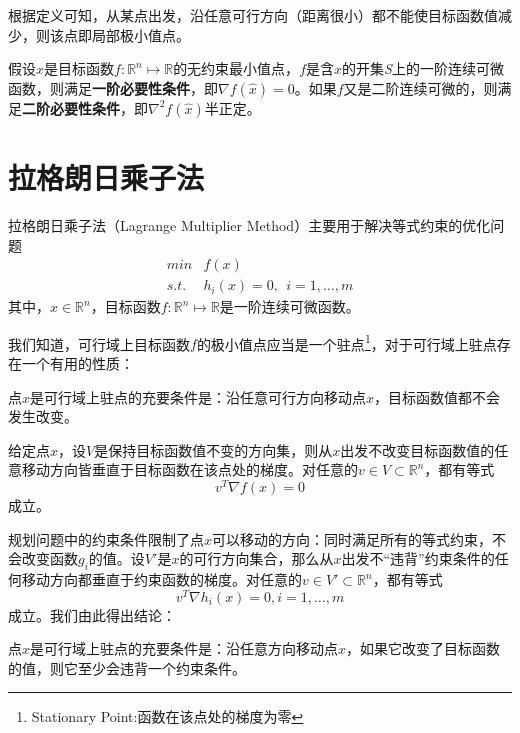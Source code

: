 根据定义可知，从某点出发，沿任意可行方向（距离很小）都不能使目标函数值减少，则该点即局部极小值点。

\begin{theorem}[最优化的必要性条件]
假设$\hat x$是目标函数$f:\mathbb R^n \mapsto \mathbb{R}$的无约束最小值点，$f$是含$\hat x$的开集\textit{S}上的一阶连续可微函数，则满足\textbf{一阶必要性条件}，即$\nabla f(\hat x) = 0$。如果$f$又是二阶连续可微的，则满足\textbf{二阶必要性条件}，即$\nabla^2 f(\hat x)$半正定。
\end{theorem}

\section{拉格朗日乘子法}
拉格朗日乘子法（Lagrange Multiplier Method）主要用于解决等式约束的优化问题
\begin{equation}
    \begin{array}{lll}
      \textit{min} & f(x) \\
      \textit{s.t.} & h_i(x) = 0,~~i = 1,\ldots,m
    \end{array}
\end{equation}
其中，$x\in\mathbb{R}^n$，目标函数$f:\mathbb{R}^n \mapsto \mathbb{R}$是一阶连续可微函数。

我们知道，可行域上目标函数$f$的极小值点应当是一个驻点\footnote{Stationary Point:函数在该点处的梯度为零}，对于可行域上驻点存在一个有用的性质：
\begin{theorem}
点$x$是可行域上驻点的充要条件是：沿任意可行方向移动点$x$，目标函数值都不会发生改变。
\end{theorem}

给定点$x$，设$V$是保持目标函数值不变的方向集，则从$x$出发不改变目标函数值的任意移动方向皆垂直于目标函数在该点处的梯度。对任意的$v\in V\subset \mathbb{R}^n$，都有等式
\begin{equation}
    v^T \nabla f(x) = 0
\end{equation}
成立。

规划问题中的约束条件限制了点$x$可以移动的方向：同时满足所有的等式约束，不会改变函数$g_i$的值。设$V'$是$x$的可行方向集合，那么从$x$出发不“违背”约束条件的任何移动方向都垂直于约束函数的梯度。对任意的$v\in V'\subset \mathbb{R}^n$，都有等式
\begin{equation}
    v^T \nabla h_i(x) = 0, i = 1,\ldots,m
\end{equation}
成立。我们由此得出结论：
\begin{theorem}
点$x$是可行域上驻点的充要条件是：沿任意方向移动点$x$，如果它改变了目标函数的值，则它至少会违背一个约束条件。
\end{theorem}

